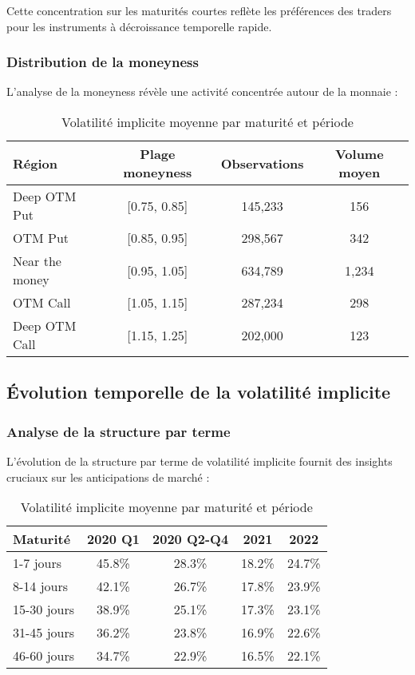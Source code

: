 \begin{table}[H]
Cette concentration sur les maturités courtes reflète les préférences des traders pour les instruments à décroissance temporelle rapide.

\subsubsection{Distribution de la moneyness}

L'analyse de la moneyness révèle une activité concentrée autour de la monnaie :

\begin{table}[H]
\centering
\caption{Distribution de la moneyness}
\begin{tabular}{@{}lccc@{}}
\toprule
\textbf{Région} & \textbf{Plage moneyness} & \textbf{Observations} & \textbf{Volume moyen} \\
\midrule
Deep OTM Put & [0.75, 0.85] & 145,233 & 156 \\
OTM Put & [0.85, 0.95] & 298,567 & 342 \\
Near the money & [0.95, 1.05] & 634,789 & 1,234 \\
OTM Call & [1.05, 1.15] & 287,234 & 298 \\
Deep OTM Call & [1.15, 1.25] & 202,000 & 123 \\
\bottomrule
\end{tabular}
\end{table}

\subsection{Évolution temporelle de la volatilité implicite}

\subsubsection{Analyse de la structure par terme}

L'évolution de la structure par terme de volatilité implicite fournit des insights cruciaux sur les anticipations de marché :

\begin{table}[H]
\centering
\caption{Volatilité implicite moyenne par maturité et période}
\begin{tabular}{@{}lcccc@{}}
\toprule
\textbf{Maturité} & \textbf{2020 Q1} & \textbf{2020 Q2-Q4} & \textbf{2021} & \textbf{2022} \\
\midrule
1-7 jours & 45.8\% & 28.3\% & 18.2\% & 24.7\% \\
8-14 jours & 42.1\% & 26.7\% & 17.8\% & 23.9\% \\
15-30 jours & 38.9\% & 25.1\% & 17.3\% & 23.1\% \\
31-45 jours & 36.2\% & 23.8\% & 16.9\% & 22.6\% \\
46-60 jours & 34.7\% & 22.9\% & 16.5\% & 22.1\% \\
\bottomrule
\end{tabular}
\end{table}


\end{table}
